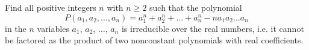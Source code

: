 Find all positive integers $n$ with $n \ge 2$ such that the polynomial \[ P(a_1, a_2, ..., a_n) = a_1^n+a_2^n + ... + a_n^n - n a_1 a_2 ... a_n \] in the $n$ variables $a_1$, $a_2$, $\dots$, $a_n$ is irreducible over the real numbers, i.e. it cannot be factored as the product of two nonconstant polynomials with real coefficients.

